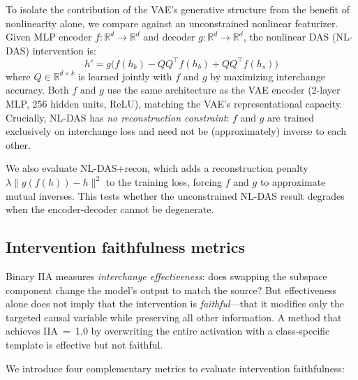 \documentclass{article}
\newcommand{\R}{\mathbb{R}}
\begin{document}
To isolate the contribution of the VAE's generative structure from the benefit
of nonlinearity alone, we compare against an unconstrained nonlinear featurizer.
Given MLP encoder $f: \R^d \to \R^d$ and decoder $g: \R^d \to \R^d$, the
nonlinear DAS (NL-DAS) intervention is:
\begin{equation}
h' = g\bigl(f(h_b) - QQ^\top f(h_b) + QQ^\top f(h_s)\bigr)
\label{eq:nldas}
\end{equation}
where $Q \in \R^{d \times k}$ is learned jointly with $f$ and $g$ by maximizing
interchange accuracy. Both $f$ and $g$ use the same architecture as the VAE
encoder (2-layer MLP, 256 hidden units, ReLU), matching the VAE's representational
capacity. Crucially, NL-DAS has \emph{no reconstruction constraint}: $f$ and $g$
are trained exclusively on interchange loss and need not be (approximately)
inverse to each other.

We also evaluate NL-DAS+recon, which adds a reconstruction penalty
$\lambda \| g(f(h)) - h \|^2$ to the training loss, forcing $f$ and $g$ to
approximate mutual inverses. This tests whether the unconstrained NL-DAS result
degrades when the encoder-decoder cannot be degenerate.

\subsection{Intervention faithfulness metrics}
\label{sec:faithfulness_metrics}

Binary IIA measures \emph{interchange effectiveness}: does swapping the
subspace component change the model's output to match the source? But
effectiveness alone does not imply that the intervention is \emph{faithful}---that
it modifies only the targeted causal variable while preserving all other
information. A method that achieves IIA~=~1.0 by overwriting the entire
activation with a class-specific template is effective but not faithful.

We introduce four complementary metrics to evaluate intervention faithfulness:
\end{document}
